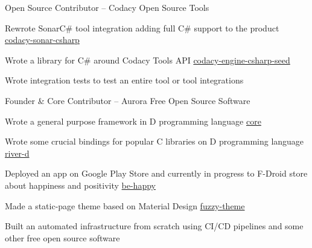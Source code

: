 
\begin{cventries}

  \cventry
    {Open Source Contributor -- \href{https://github.com/codacy}{\faGithubSquare\acvHeaderIconSep\@codacy}} %
    {Codacy Open Source Tools} %
    {} %
    {} %
    {
      \begin{cvitems} %
        \item {Rewrote SonarC\# tool integration adding full C\# support to the product \hfill \href{https://github.com/codacy/codacy-sonar-csharp}{codacy-sonar-csharp\acvHeaderIconSep\@\faGithubSquare}}
        \item {Wrote a library for C\# around Codacy Tools API \hfill \href{https://github.com/codacy/codacy-engine-csharp-seed}{codacy-engine-csharp-seed\acvHeaderIconSep\@\faGithubSquare}}
        \item {Wrote integration tests to test an entire tool or tool integrations}
      \end{cvitems}
    }

  \cventry
    {Founder \& Core Contributor --
    \href{https://gitlab.com/aurorafossorg}{\faGitlab\acvHeaderIconSep\@aurorafossorg}} %
    {Aurora Free Open Source Software} %
    {} %
    {} %
    {
      \begin{cvitems} %
        \item {Wrote a general purpose framework in D programming language \hfill
        \href{https://gitlab.com/aurorafossorg/p/framework/core}{core\acvHeaderIconSep\@\faGitlab}}
        \item {Wrote some crucial bindings for popular C libraries on D programming language \hfill \href{https://gitlab.com/aurorafossorg/p/riverd}{river-d\acvHeaderIconSep\@\faGitlab}}
        \item{Deployed an app on Google Play Store and currently in progress to F-Droid store about happiness and positivity \hfill \href{https://gitlab.com/aurorafossorg/apps/be-happy}{be-happy\acvHeaderIconSep\@\faGitlab}}
        \item{Made a static-page theme based on Material Design \hfill \href{https://gitlab.com/aurorafossorg/fuzzy-theme}{fuzzy-theme\acvHeaderIconSep\@\faGitlab}}
        \item{Built an automated infrastructure from scratch using CI/CD pipelines and some other free open source software}
      \end{cvitems}
    }


\end{cventries}
